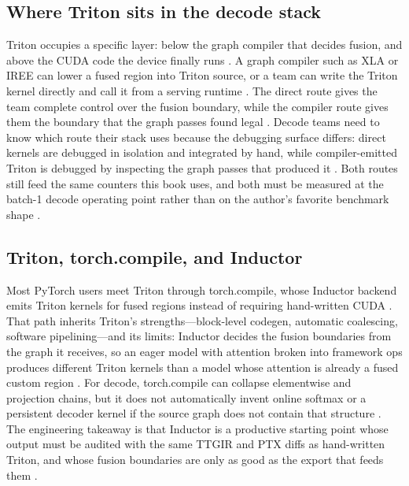 \subsection{Where Triton sits in the decode stack}

Triton occupies a specific layer: below the graph compiler that decides fusion, and above the CUDA code the device finally runs \citep{tillet2019triton,chen2020compilerbasedhardw}. A graph compiler such as XLA or IREE can lower a fused region into Triton source, or a team can write the Triton kernel directly and call it from a serving runtime \citep{openxla2024,tritonlang2024}. The direct route gives the team complete control over the fusion boundary, while the compiler route gives them the boundary that the graph passes found legal \citep{patel2025llminference,memoryfloor2026}. Decode teams need to know which route their stack uses because the debugging surface differs: direct kernels are debugged in isolation and integrated by hand, while compiler-emitted Triton is debugged by inspecting the graph passes that produced it \citep{chen2020compilerbasedhardw,patel2025llminference}. Both routes still feed the same counters this book uses, and both must be measured at the batch-1 decode operating point rather than on the author's favorite benchmark shape \citep{taxbreak2026,memoryfloor2026}.

\subsection{Triton, torch.compile, and Inductor}

Most PyTorch users meet Triton through torch.compile, whose Inductor backend emits Triton kernels for fused regions instead of requiring hand-written CUDA \citep{patel2025llminference,chen2020compilerbasedhardw}. That path inherits Triton's strengths---block-level codegen, automatic coalescing, software pipelining---and its limits: Inductor decides the fusion boundaries from the graph it receives, so an eager model with attention broken into framework ops produces different Triton kernels than a model whose attention is already a fused custom region \citep{dao2022flashattention,patel2025llminference}. For decode, torch.compile can collapse elementwise and projection chains, but it does not automatically invent online softmax or a persistent decoder kernel if the source graph does not contain that structure \citep{dao2022flashattention,taxbreak2026}. The engineering takeaway is that Inductor is a productive starting point whose output must be audited with the same TTGIR and PTX diffs as hand-written Triton, and whose fusion boundaries are only as good as the export that feeds them \citep{chen2020compilerbasedhardw,memoryfloor2026}.

